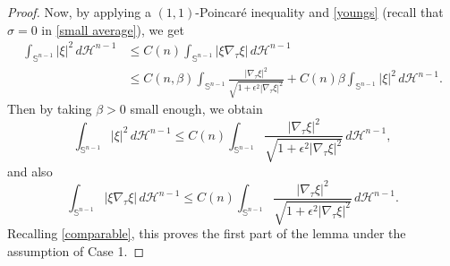 \documentclass[reqno,11pt]{amsart}
\def\ez{\epsilon}
\def\bz{\beta}
\def\sz{\sigma}
\numberwithin{equation}{section}
\theoremstyle{remark}
\begin{document}
\begin{proof}
Now, by applying a $(1,1)$-Poincar\'e inequality and \eqref{youngs} (recall that $\sz=0$ in \eqref{small average}), we get
\begin{align*}
\int_{\mathbb S^{n-1}} |\xi|^2 \,d\mathscr H^{n-1}& \leq  C(n) \int_{\mathbb S^{n-1}} |\xi \nabla_\tau \xi| \,d\mathscr H^{n-1}\\
& \leq  C(n,\bz) \int_{\mathbb S^{n-1}}  \frac{|\nabla_\tau  \xi|^2}{\sqrt{1+\ez^2|\nabla_\tau \xi|^2}}   + C(n)\bz \int_{\mathbb S^{n-1}}   |\xi|^2 \,d\mathscr H^{n-1}.
\end{align*}
Then by taking $\bz>0$ small enough, we obtain
\begin{equation}\label{xi2 L2}
 \int_{\mathbb S^{n-1}} |\xi|^2 \,d\mathscr H^{n-1} \le  C(n)  \int_{\mathbb S^{n-1}} \frac{|\nabla_\tau  \xi|^2}{\sqrt{1+\ez^2|\nabla_\tau \xi|^2}} \,d\mathscr H^{n-1},
\end{equation}
and also
\begin{equation}\label{xi2 W11}
    \int_{\mathbb S^{n-1}} |\xi \nabla_\tau \xi| \,d\mathscr H^{n-1}\le  C(n)  \int_{\mathbb S^{n-1}} \frac{|\nabla_\tau  \xi|^2}{\sqrt{1+\ez^2|\nabla_\tau \xi|^2}} \,d\mathscr H^{n-1}.
\end{equation}
Recalling \eqref{comparable}, this proves the first part of the lemma under the assumption of Case 1.


\end{proof}
\end{document}
